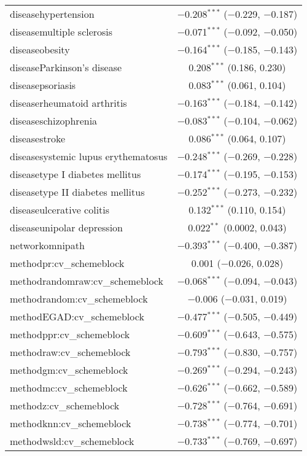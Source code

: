 \begin{table}[!htbp]
\begin{tabular}{@{\extracolsep{5pt}}lc}
  diseasehypertension & $-$0.208$^{***}$ ($-$0.229, $-$0.187) \\ 
  diseasemultiple sclerosis & $-$0.071$^{***}$ ($-$0.092, $-$0.050) \\ 
  diseaseobesity & $-$0.164$^{***}$ ($-$0.185, $-$0.143) \\ 
  diseaseParkinson's disease & 0.208$^{***}$ (0.186, 0.230) \\ 
  diseasepsoriasis & 0.083$^{***}$ (0.061, 0.104) \\ 
  diseaserheumatoid arthritis & $-$0.163$^{***}$ ($-$0.184, $-$0.142) \\ 
  diseaseschizophrenia & $-$0.083$^{***}$ ($-$0.104, $-$0.062) \\ 
  diseasestroke & 0.086$^{***}$ (0.064, 0.107) \\ 
  diseasesystemic lupus erythematosus & $-$0.248$^{***}$ ($-$0.269, $-$0.228) \\ 
  diseasetype I diabetes mellitus & $-$0.174$^{***}$ ($-$0.195, $-$0.153) \\ 
  diseasetype II diabetes mellitus & $-$0.252$^{***}$ ($-$0.273, $-$0.232) \\ 
  diseaseulcerative colitis & 0.132$^{***}$ (0.110, 0.154) \\ 
  diseaseunipolar depression & 0.022$^{**}$ (0.0002, 0.043) \\ 
  networkomnipath & $-$0.393$^{***}$ ($-$0.400, $-$0.387) \\ 
  methodpr:cv\_schemeblock & 0.001 ($-$0.026, 0.028) \\ 
  methodrandomraw:cv\_schemeblock & $-$0.068$^{***}$ ($-$0.094, $-$0.043) \\ 
  methodrandom:cv\_schemeblock & $-$0.006 ($-$0.031, 0.019) \\ 
  methodEGAD:cv\_schemeblock & $-$0.477$^{***}$ ($-$0.505, $-$0.449) \\ 
  methodppr:cv\_schemeblock & $-$0.609$^{***}$ ($-$0.643, $-$0.575) \\ 
  methodraw:cv\_schemeblock & $-$0.793$^{***}$ ($-$0.830, $-$0.757) \\ 
  methodgm:cv\_schemeblock & $-$0.269$^{***}$ ($-$0.294, $-$0.243) \\ 
  methodmc:cv\_schemeblock & $-$0.626$^{***}$ ($-$0.662, $-$0.589) \\ 
  methodz:cv\_schemeblock & $-$0.728$^{***}$ ($-$0.764, $-$0.691) \\ 
  methodknn:cv\_schemeblock & $-$0.738$^{***}$ ($-$0.774, $-$0.701) \\ 
  methodwsld:cv\_schemeblock & $-$0.733$^{***}$ ($-$0.769, $-$0.697) \\ 

\end{tabular}
\end{table}
